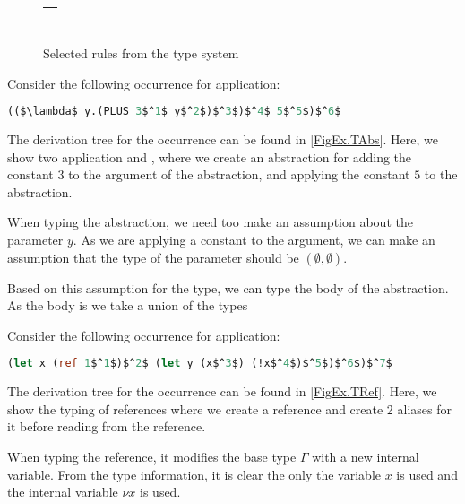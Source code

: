 \documentclass[../../master.tex]{subfiles}
\begin{document}
\begin{figure}[H]
	\setlength\tabcolsep{8pt}
	\begin{tabular}{l}
		\\[0.7cm]
		\\[0.7cm]
		\\[0.7cm]
		\\[0.7cm]
		\\[0.7cm]
	\end{tabular}
	\caption{Selected rules from the type system}
	\label{fig:TypeSys}
\end{figure}

\begin{example}
	Consider the following occurrence for application:
	\begin{lstlisting}[language=Caml, mathescape=true]
		(($\lambda$ y.(PLUS 3$^1$ y$^2$)$^3$)$^4$ 5$^5$)$^6$
	\end{lstlisting}
	The derivation tree for the occurrence can be found in \cref{FigEx.TAbs}.
	Here, we show two application  and , where we create an abstraction for adding the constant $3$ to the argument of the abstraction, and applying the constant $5$ to the abstraction.

	When typing the abstraction, we need too make an assumption about the parameter $y$.
	As we are applying a constant to the argument, we can make an assumption that the type of the parameter should be $(\emptyset,\emptyset)$.

	Based on this assumption for the type, we can type the body of the abstraction.
	As the body is  we take a union of the types
\end{example}

\begin{example}
	Consider the following occurrence for application:
	\begin{lstlisting}[language=Caml, mathescape=true]
		(let x (ref 1$^1$)$^2$ (let y (x$^3$) (!x$^4$)$^5$)$^6$)$^7$
	\end{lstlisting}
	The derivation tree for the occurrence can be found in \cref{FigEx.TRef}.
	Here, we show the typing of references where we create a reference and create 2 aliases for it before reading from the reference.
	
	When typing the reference, it modifies the base type $\Gamma$ with a new internal variable.
	From the type information, it is clear the only the variable $x$ is used and the internal variable $\nu x$ is used.
\end{example}

\begin{landscape}

\end{landscape}
\end{document}
